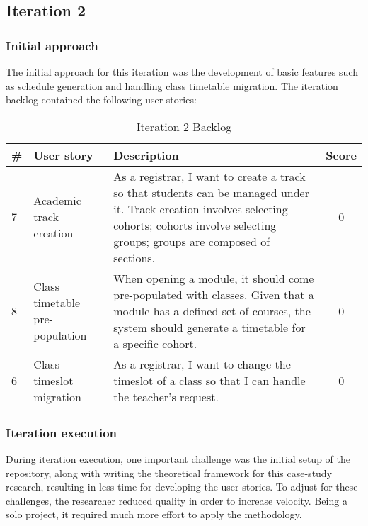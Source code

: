 \subsection{Iteration 2}

\subsubsection{Initial approach}
The initial approach for this iteration was the development of basic features such as schedule generation and handling class timetable migration.  
The iteration backlog contained the following user stories:

\begin{table}[ht]
\centering
\caption{Iteration 2 Backlog}
\label{tab:iteration-2-backlog}
\begin{tabular}{l p{6cm} p{6cm} c}
\hline
\textbf{\#} &
\textbf{User story} &
\textbf{Description} &
\textbf{Score} \\
\hline
    7 & 
    Academic track creation &
    As a registrar, I want to create a track so that students can be managed under it.
    Track creation involves selecting cohorts; cohorts involve selecting groups; groups are composed of sections. &
    0 \\

    8 &
    Class timetable pre-population &
    When opening a module, it should come pre-populated with classes.
    Given that a module has a defined set of courses, the system should generate a timetable for a specific cohort. &
    0 \\

    6 &
    Class timeslot migration &
    As a registrar, I want to change the timeslot of a class so that I can handle the teacher’s request. &
    0 \\
\hline
\end{tabular}
\end{table}

\subsubsection{Iteration execution}
During iteration execution, one important challenge was the initial setup of the repository, along with writing the theoretical framework for this case-study research, resulting in less time for developing the user stories.
To adjust for these challenges, the researcher reduced quality in order to increase velocity.
Being a solo project, it required much more effort to apply the methodology.

